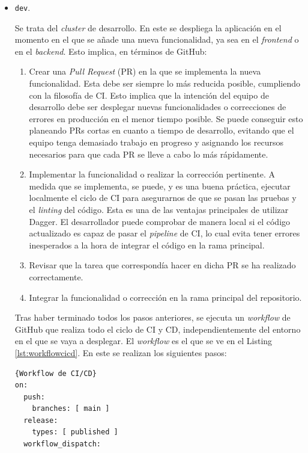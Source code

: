 \begin{itemize}
  \item \texttt{dev}.

    Se trata del \textit{cluster} de desarrollo. En este se despliega la aplicación en el momento en el que se añade una nueva funcionalidad, ya sea en el \textit{frontend} o en el \textit{backend}. Esto implica, en términos de GitHub:

    \begin{enumerate}
      \item Crear una \textit{Pull Request} (PR) en la que se implementa la nueva funcionalidad. Esta debe ser siempre lo más reducida posible, cumpliendo con la filosofía de CI. Esto implica que la intención del equipo de desarrollo debe ser desplegar nuevas funcionalidades o correcciones de errores en producción en el menor tiempo posible. Se puede conseguir esto planeando PRs cortas en cuanto a tiempo de desarrollo, evitando que el equipo tenga demasiado trabajo en progreso y asignando los recursos necesarios para que cada PR se lleve a cabo lo más rápidamente\cite{linear}.
      \item Implementar la funcionalidad o realizar la corrección pertinente. A medida que se implementa, se puede, y es una buena práctica, ejecutar localmente el ciclo de CI para asegurarnos de que se pasan las pruebas y el \textit{linting} del código. Esta es una de las ventajas principales de utilizar Dagger. El desarrollador puede comprobar de manera local si el código actualizado es capaz de pasar el \textit{pipeline} de CI, lo cual evita tener errores inesperados a la hora de integrar el código en la rama principal.
      \item Revisar que la tarea que correspondía hacer en dicha PR se ha realizado correctamente.
      \item Integrar la funcionalidad o corrección en la rama principal del repositorio.
    \end{enumerate}

    Tras haber terminado todos los pasos anteriores, se ejecuta un \textit{workflow} de GitHub que realiza todo el ciclo de CI y CD, independientemente del entorno en el que se vaya a desplegar. El \textit{workflow} es el que se ve en el Listing \ref{lst:workflowcicd}. En este se realizan los siguientes pasos:

\begin{lstlisting}[language=workflows,label=lst:workflowcicd]{Workflow de CI/CD}
on:
  push:
    branches: [ main ]
  release:
    types: [ published ]
  workflow_dispatch:


\end{lstlisting}
\end{itemize}
